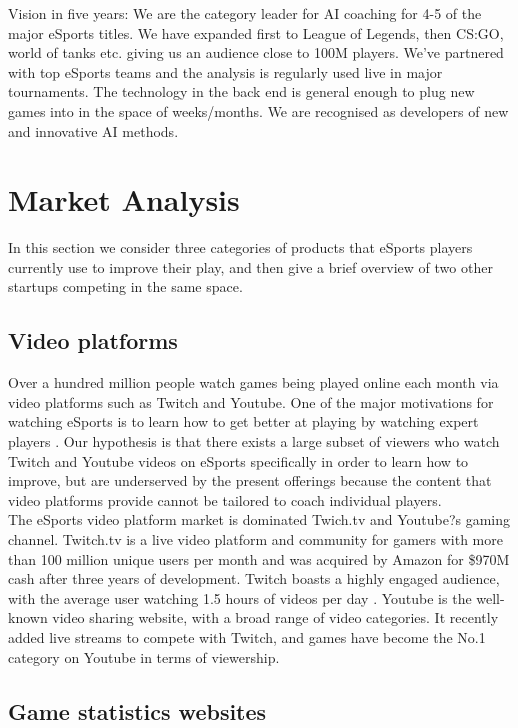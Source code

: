 \documentclass[12pt]{report} %
\begin{document}
Vision in five years: 
We are the category leader for AI coaching for 4-5 of the major eSports titles. We have expanded first to League of Legends, then CS:GO, world of tanks etc. giving us an audience close to 100M players. We've partnered with top eSports teams and the analysis is regularly used live in major tournaments. The technology in the back end is general enough to plug new games into in the space of weeks/months. We are recognised as developers of new and innovative AI methods.

\section{Market Analysis}
 
In this section we consider three categories of products that eSports players currently use to improve their play, and then give a brief overview of two other startups competing in the same space.
 
\subsection{Video platforms}
 
Over a hundred million people watch games being played online each month via video platforms such as Twitch and Youtube. One of the major motivations for watching eSports is to learn how to get better at playing by watching expert players \cite{Hamari15}. Our hypothesis is that there exists a large subset of viewers who watch Twitch and Youtube videos on eSports specifically in order to learn how to improve, but are underserved by the present offerings because the content that video platforms provide cannot be tailored to coach individual players.\\
 
The eSports video platform market is dominated Twich.tv and Youtube?s gaming channel. Twitch.tv is a live video platform and community for gamers with more than 100 million unique users per month and was acquired by Amazon for \$970M cash after three years of development. Twitch boasts a highly engaged audience, with the average user watching 1.5 hours of videos per day \cite{Dredge}. Youtube is the well-known video sharing website, with a broad range of video categories. It recently added live streams to compete with Twitch, and games have become the No.1 category on Youtube in terms of viewership.
 
\subsection{Game statistics websites}
 
\end{document}
